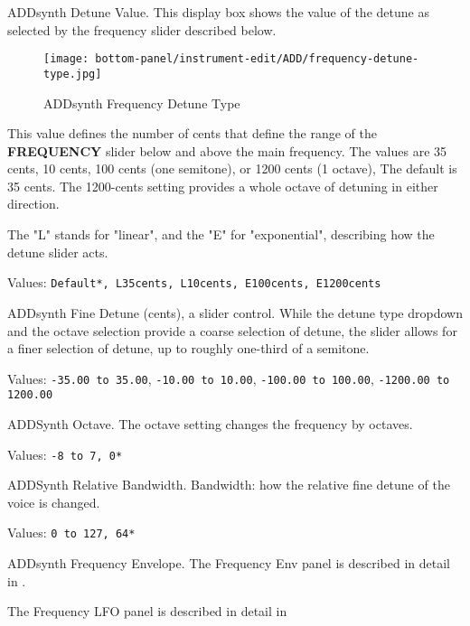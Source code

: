    ADDsynth Detune Value.
   This display box shows the value of the detune as selected by the
   frequency slider described below.

\begin{figure}[H]
   \centering
   \texttt{[image: bottom-panel/instrument-edit/ADD/frequency-detune-type.jpg]}
   \caption{ADDsynth Frequency Detune Type}
   \label{fig:addsynth_freq_detune_type}
\end{figure}

   This value defines the number of cents that define the range of the
   \textbf{FREQUENCY} slider below and above the main frequency.
   The values are 35 cents, 10 cents, 100 cents (one semitone), or
   1200 cents (1 octave),  The default is 35 cents.  The 1200-cents
   setting provides a whole octave of detuning in either direction.

   The "L" stands for "linear", and the "E" for "exponential", describing
   how the detune slider acts.

   Values: \texttt{Default*, L35cents, L10cents, E100cents, E1200cents}

   ADDsynth Fine Detune (cents), a slider control.
   While the detune type dropdown and the octave selection provide a coarse
   selection of detune, the slider allows for a finer selection of detune,
   up to roughly one-third of a semitone.

   Values:
      \texttt{-35.00 to 35.00},
      \texttt{-10.00 to 10.00},
      \texttt{-100.00 to 100.00},
      \texttt{-1200.00 to 1200.00}

   ADDSynth Octave.
   The octave setting changes the frequency by octaves.

   Values: \texttt{-8 to 7, 0*}

   ADDSynth Relative Bandwidth.
   Bandwidth: how the relative fine detune of the voice is changed.

   Values: \texttt{0 to 127, 64*}

   ADDsynth Frequency Envelope.
   The Frequency Env panel is described in detail in
   .

   The Frequency LFO panel is described in detail in


